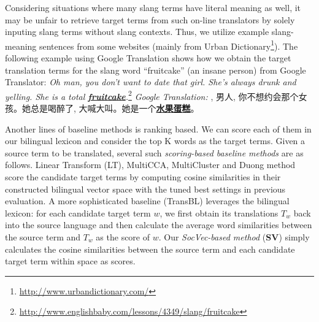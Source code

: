 Considering situations where many slang terms have literal meaning as well, it may be unfair to retrieve target terms from such on-line translators by solely inputing slang terms without slang contexts. 
Thus, we utilize example slang-meaning sentences from some websites (mainly from Urban 
Dictionary\footnote{\scriptsize{\url{http://www.urbandictionary.com/}}}). 
The following example using Google Translation shows how we obtain the target translation terms for the slang word ``fruitcake'' (an insane person) from Google Translator:
{\textit{Oh man, you don't want to date that girl. She's always drunk and yelling. She is a total \underline{\textbf{fruitcake}}.}}\footnote{\scriptsize{\url{http://www.englishbaby.com/lessons/4349/slang/fruitcake}}} 
\textit{Google Translation:}
{, 男人, 你不想约会那个女孩。她总是喝醉了, 大喊大叫。她是一个\underline{\textbf{水果蛋糕}}。}

Another lines of baseline methods is ranking based.
We can score each of them in our bilingual lexicon and consider the top K words as the target terms. 
Given a source term to be translated, several such {\em scoring-based baseline methods} are as follows.
Linear Transform (LT), MultiCCA, MultiCluster and Duong method score the candidate target terms by 
computing cosine similarities in their constructed bilingual vector space with the tuned best settings in previous evaluation. 
A more sophisticated baseline (TransBL) leverages the bilingual lexicon: 
for each candidate target term $w$, we first obtain its translations 
$T_w$ back into the source language and then calculate the average word similarities between the source term and $T_w$  as the score of $w$. 
Our {\em SocVec-based method} (\textbf{SV}) simply calculates the cosine similarities between the source term and each candidate target term within \textit{\socvec} space as scores.

